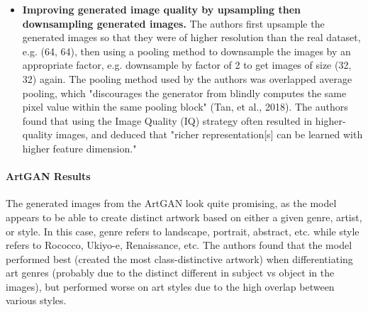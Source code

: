 \documentclass[11pt]{article}
\providecommand{\tightlist}{%
      \setlength{\itemsep}{0pt}\setlength{\parskip}{0pt}}
\begin{document}
\begin{itemize}
\tightlist
\item
  \textbf{Improving generated image quality by upsampling then
  downsampling generated images.} The authors first upsample the
  generated images so that they were of higher resolution than the real
  dataset, e.g. (64, 64), then using a pooling method to downsample the
  images by an appropriate factor, e.g. downsample by factor of 2 to get
  images of size (32, 32) again. The pooling method used by the authors
  was overlapped average pooling, which "discourages the generator from
  blindly computes the same pixel value within the same pooling block"
  (Tan, et al., 2018). The authors found that using the Image Quality
  (IQ) strategy often resulted in higher-quality images, and deduced
  that "richer representation{[}s{]} can be learned with higher feature
  dimension."
\end{itemize}

\paragraph{ArtGAN Results}\label{artgan-results}

The generated images from the ArtGAN look quite promising, as the model
appears to be able to create distinct artwork based on either a given
genre, artist, or style. In this case, genre refers to landscape,
portrait, abstract, etc. while style refers to Rococco, Ukiyo-e,
Renaissance, etc. The authors found that the model performed best
(created the most class-distinctive artwork) when differentiating art
genres (probably due to the distinct different in subject vs object in
the images), but performed worse on art styles due to the high overlap
between various styles.

      \begin{center}
    \end{center}
    
          \begin{center}
    \end{center}
    
          \begin{center}
    \end{center}
\end{document}
